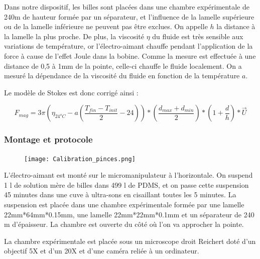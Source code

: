  Dans notre dispositif, les billes sont placées dans une chambre expérimentale de 240\micro m de hauteur formée par un séparateur, et l'influence de la lamelle supérieure ou de la lamelle inférieure ne peuvent pas être exclues. On appelle $h$ la distance à la lamelle la plus proche. 
 De plus, la viscosité $\eta$ du fluide est très sensible aux variations de température, or l'électro-aimant chauffe pendant l'application de la force à cause de l'effet Joule dans la bobine. 
 Comme la mesure est effectuée à une distance de 0,5 à 1mm de la pointe, celle-ci chauffe le fluide localement. 
 On a mesuré la dépendance de la viscosité du fluide en fonction de la température $a$. 
 
 Le modèle de Stokes est donc corrigé ainsi : 
 
 \begin{equation}
 {F}_{mag}= 3 \pi \left(\eta_{24^{o}C}-a\left(\frac{T_{fin}-T_{init}}{2} - 24\right) \right) *\left( \frac{d_{max}+d_{min}}{2} \right) * \left( 1+\frac{d}{h} \right)*\vec{U}
 \label{Stokes_corr}
 \end{equation}
 
 \subsubsection{Montage et protocole}
 
 \begin{figure}
 \texttt{[image: Calibration\_pinces.png]}
 \label{calibration_pinces}
 \end{figure}
 

 
 L'électro-aimant est monté sur le micromanipulateur à l'horizontale.  
 On suspend 1 \micro l de solution mère de billes dans 499 \micro l de PDMS, et on passe cette suspension 45 minutes dans une cuve à ultra-sons en cisaillant toutes les 5 minutes.
 La suspension est placée dans une chambre expérimentale formée par une lamelle 22mm*64mm*0.15mm, une lamelle 22mm*22mm*0.1mm et un séparateur de 240 \micro m d'épaisseur. La chambre est ouverte du côté où l'on va approcher la pointe. 
 
 La chambre expérimentale est placée sous un microscope droit Reichert doté d'un objectif 5X et d'un 20X et d'une caméra reliée à un ordinateur.
 
